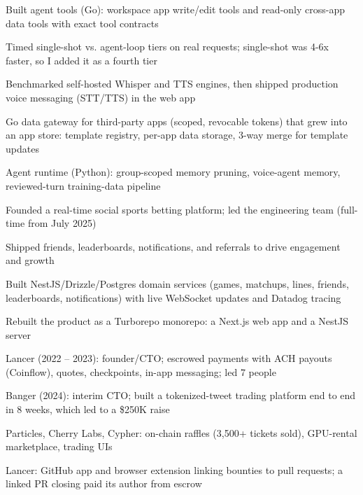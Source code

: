 \documentclass[print]{jack-resume}
\begin{document}
\begin{tightemize}
    \item Built agent tools (Go): workspace app write/edit tools and read-only cross-app data tools with exact tool contracts
    \item Timed single-shot vs. agent-loop tiers on real requests; single-shot was 4-6x faster, so I added it as a fourth tier
    \item Benchmarked self-hosted Whisper and TTS engines, then shipped production voice messaging (STT/TTS) in the web app
    \item Go data gateway for third-party apps (scoped, revocable tokens) that grew into an app store: template registry, per-app data storage, 3-way merge for template updates
    \item Agent runtime (Python): group-scoped memory pruning, voice-agent memory, reviewed-turn training-data pipeline
\end{tightemize}
\sectionsep

\begin{tightemize}
    \item Founded a real-time social sports betting platform; led the engineering team (full-time from July 2025)
    \item Shipped friends, leaderboards, notifications, and referrals to drive engagement and growth
    \item Built NestJS/Drizzle/Postgres domain services (games, matchups, lines, friends, leaderboards, notifications) with live WebSocket updates and Datadog tracing
    \item Rebuilt the product as a Turborepo monorepo: a Next.js web app and a NestJS server
\end{tightemize}
\sectionsep

\begin{tightemize}
    \item Lancer (2022 -- 2023): founder/CTO; escrowed payments with ACH payouts (Coinflow), quotes, checkpoints, in-app messaging; led 7 people
    \item Banger (2024): interim CTO; built a tokenized-tweet trading platform end to end in 8 weeks, which led to a \$250K raise
    \item Particles, Cherry Labs, Cypher: on-chain raffles (3,500+ tickets sold), GPU-rental marketplace, trading UIs
    \item Lancer: GitHub app and browser extension linking bounties to pull requests; a linked PR closing paid its author from escrow
\end{tightemize}
\sectionsep
\end{document}
